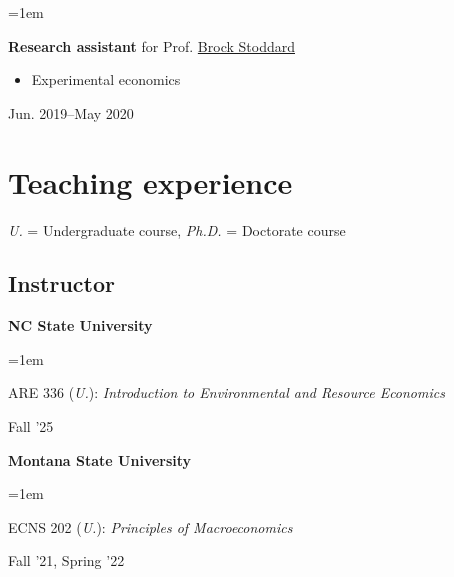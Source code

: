 \documentclass[12pt]{article}
\newenvironment{highlightsforbulletentries}{
	\begin{itemize}[
		topsep=0.10 cm,
		partopsep=0pt,
		leftmargin=20pt,
		]
	\setlength{\parsep}{0.10cm}\setlength{\itemsep}{-2pt}
	}{
	\end{itemize}
}
\newenvironment{twocolentry}[2][]{%
	\par\noindent\def\secondColumn{#2}%
	\begin{minipage}[t]{\linewidth-5.1cm}\raggedright\hangindent=1em\hangafter=1\relax%
	}
	{%
		\end{minipage}\hfill%
		\begin{minipage}[t]{5cm}\raggedleft\secondColumn\end{minipage}\par\smallskip
	}
\begin{document}
\begin{twocolentry}
	{Jun. 2019--May 2020}
	\textbf{Research assistant} for Prof. \href{https://sites.google.com/a/appstate.edu/brock_stoddard/home}{Brock Stoddard}
	\begin{highlightsforbulletentries}
		\item Experimental economics
	\end{highlightsforbulletentries}
\end{twocolentry}

\section{Teaching experience}

\vspace{-0.1cm}

{\footnotesize \textit{U.} = Undergraduate course, \textit{Ph.D.} = Doctorate course}

\subsection{Instructor}

\vspace{0.1cm}

\textbf{NC State University}
\begin{twocolentry}
	{Fall '25}
	{ARE 336 (\emph{U.}): \emph{Introduction to Environmental and Resource Economics}}
\end{twocolentry}

\vspace{0.1cm}

\textbf{Montana State University}
\begin{twocolentry}
	{Fall '21, Spring '22}
	{ECNS 202 (\emph{U.}): \emph{Principles of Macroeconomics}}
\end{twocolentry}

\end{document}
